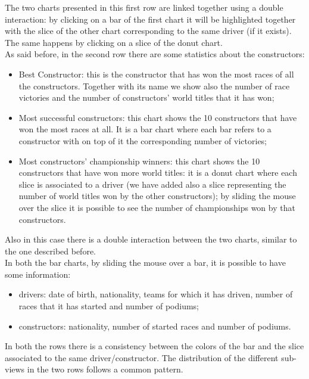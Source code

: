 \documentclass[11pt,twocolumn,letterpaper]{article}
\begin{document}
The two charts presented in this first row are linked together using a double interaction: by clicking on a bar of the first chart it will be highlighted together with the slice of the other chart corresponding to the same driver (if it exists). The same happens by clicking on a slice of the donut chart.\\
As said before, in the second row there are some statistics about the constructors:
\begin{itemize}
	\item Best Constructor: this is the constructor that has won the most races of all the constructors. Together with its name we show also the number of race victories and the number of constructors' world titles that it has won;
	\item Most successful constructors: this chart shows the 10 constructors that have won the most races at all. It is a bar chart where each bar refers to a constructor with on top of it the corresponding number of victories;
	\item Most constructors' championship winners: this chart shows the 10 constructors that have won more world titles: it is a donut chart where each slice is associated to a driver (we have added also a slice representing the number of world titles won by the other constructors); by sliding the mouse over the slice it is possible to see the number of championships won by that constructors.
\end{itemize}
Also in this case there is a double interaction between the two charts, similar to the one described before.\\
In both the bar charts, by sliding the mouse over a bar, it is possible to have some information:
\begin{itemize}
	\item drivers: date of birth, nationality, teams for which it has driven, number of races that it has started and number of podiums;
	\item constructors: nationality, number of started races and number of podiums.
\end{itemize}
In both the rows there is a consistency between the colors of the bar and the slice associated to the same driver/constructor. The distribution of the different sub-views in the two rows follows a common pattern.
\end{document}
